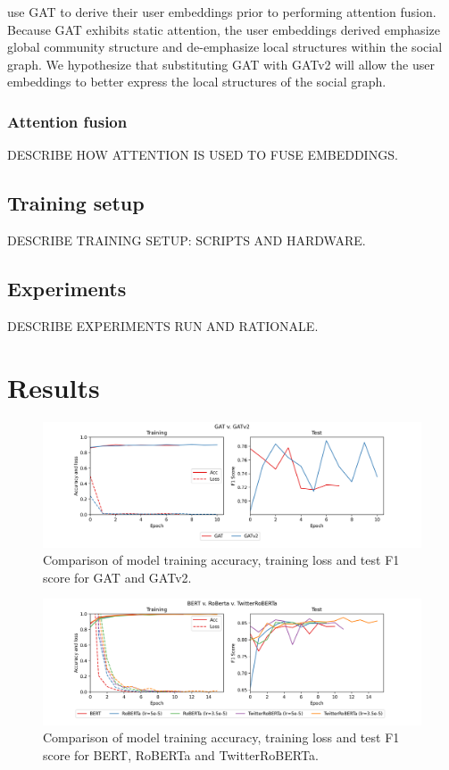 \documentclass[letterpaper]{article} %
\begin{document}
\citet{Miao2022} use GAT to derive their user embeddings prior to performing attention fusion. Because GAT exhibits static attention, the user embeddings derived emphasize global community structure and de-emphasize local structures within the social graph. We hypothesize that substituting GAT with GATv2 will allow the user embeddings to better express the local structures of the social graph.



\subsubsection{Attention fusion}

DESCRIBE HOW ATTENTION IS USED TO FUSE EMBEDDINGS.

\subsection{Training setup}

DESCRIBE TRAINING SETUP: SCRIPTS AND HARDWARE.

\subsection{Experiments}

DESCRIBE EXPERIMENTS RUN AND RATIONALE.

\section{Results}

\begin{figure}
    \includegraphics[width=\linewidth]{gat_v_gatv2.png}
    \caption{Comparison of model training accuracy, training loss and test F1 score for GAT and GATv2.}
\end{figure}

\begin{figure}
    \includegraphics[width=\linewidth]{all_berts.png}
    \caption{Comparison of model training accuracy, training loss and test F1 score for BERT, RoBERTa and TwitterRoBERTa.}
\end{figure}
\end{document}
